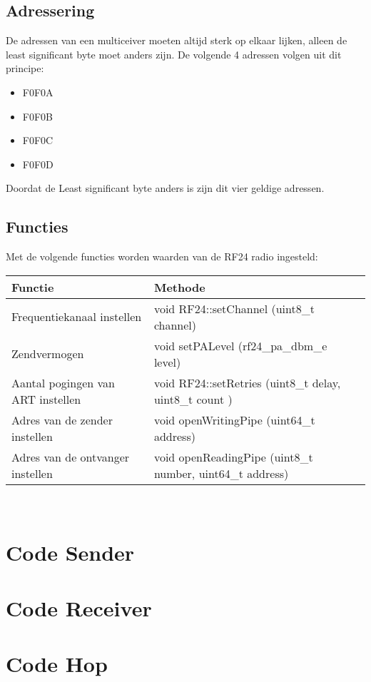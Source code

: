 \documentclass{article}
\begin{document}
\subsection{Adressering}
De adressen van een multiceiver moeten altijd sterk op elkaar lijken, alleen de least significant byte moet anders zijn. De volgende 4 adressen volgen uit dit principe:

\begin{itemize}
	\item  F0F0A
	\item  F0F0B
	\item  F0F0C
	\item  F0F0D
\end{itemize}
Doordat de Least significant byte anders is zijn dit vier geldige adressen.

\subsection{Functies}

Met de volgende functies worden waarden van de RF24 radio ingesteld:
\\
\begin{tabular}{ | l | l | p{5cm} |}
    \hline
    Functie				& Methode	\\ \hline
    Frequentiekanaal instellen	& void RF24::setChannel	(uint8\_t channel) 	\\ 
    Zendvermogen 		& void 	setPALevel (rf24\_pa\_dbm\_e level)	\\ 
    Aantal pogingen van ART instellen& void RF24::setRetries (uint8\_t delay, uint8\_t count )\\ 
    Adres van de zender instellen 	 & void	openWritingPipe (uint64\_t address)	\\
    Adres van de ontvanger instellen & void	openReadingPipe (uint8\_t number, uint64\_t address) \\ \hline
    \end{tabular}\\


\section{Code Sender}


\section{Code Receiver}


\section{Code Hop}

\end{document}
